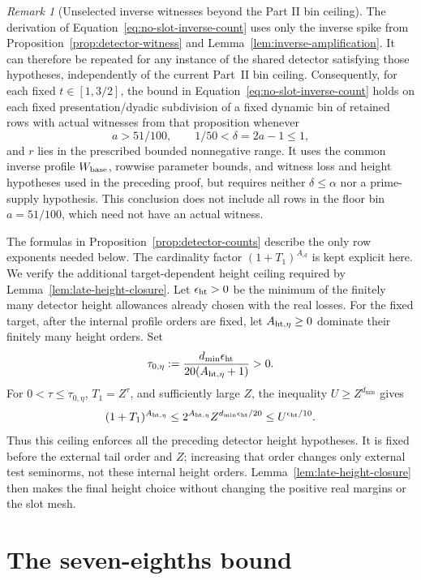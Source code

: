 \documentclass[11pt,a4paper]{article}
\numberwithin{equation}{section}
\numberwithin{figure}{section}
\theoremstyle{definition}
\theoremstyle{remark}
\newtheorem{remark}[theorem]{Remark}
\begin{document}
\begin{remark}[Unselected inverse witnesses beyond the Part II bin ceiling]
The derivation of Equation~\eqref{eq:no-slot-inverse-count} uses only the inverse spike from
Proposition~\ref{prop:detector-witness} and
Lemma~\ref{lem:inverse-amplification}.  It can therefore be repeated for any
instance of the shared detector satisfying those hypotheses, independently
of the current Part~II bin ceiling.  Consequently, for each fixed
\(t\in[1,3/2]\), the bound in Equation~\eqref{eq:no-slot-inverse-count}
holds on each fixed presentation/dyadic subdivision of a fixed dynamic
bin of retained rows with actual witnesses from that proposition whenever
\[
 a>51/100,\qquad 1/50<\delta=2a-1\le1,
\]
and \(r\) lies in the prescribed bounded nonnegative range.  It uses
the common inverse profile \(W_{\rm base}\), rowwise parameter bounds,
and witness loss and height hypotheses used in the preceding proof,
but requires neither
\(\delta\le\alpha\) nor a prime-supply hypothesis.  This conclusion
does not include all rows in the floor bin \(a=51/100\), which need
not have an actual witness.
\end{remark}

The formulas in Proposition~\ref{prop:detector-counts} describe the
only row exponents needed below.  The cardinality factor
\((1+T_1)^{A_{\mathcal A}}\) is kept explicit here.  We verify the
additional target-dependent height ceiling required by
Lemma~\ref{lem:late-height-closure}.  Let \(\epsilon_{\rm ht}>0\) be the
minimum of the finitely many detector height allowances already chosen
with the real losses.  For the fixed target, after the internal profile
orders are fixed, let \(A_{{\rm ht},\eta}\ge0\) dominate their finitely many
height orders.  Set
\[
 \tau_{0,\eta}:=
 \frac{d_{\min}\epsilon_{\rm ht}}{20(A_{{\rm ht},\eta}+1)}>0.
\]
For \(0<\tau\le\tau_{0,\eta}\), \(T_1=Z^\tau\), and sufficiently large
\(Z\), the inequality \(U\ge Z^{d_{\min}}\) gives
\[
 (1+T_1)^{A_{{\rm ht},\eta}}
 \le 2^{A_{{\rm ht},\eta}}Z^{d_{\min}\epsilon_{\rm ht}/20}
 \le U^{\epsilon_{\rm ht}/10}.
\]
Thus this ceiling enforces all the preceding detector height hypotheses.
It is fixed before the external tail order and \(Z\); increasing that
order changes only external test seminorms, not these internal height
orders.  Lemma~\ref{lem:late-height-closure} then makes the final height
choice without changing the positive real margins or the slot mesh.

\section{The seven-eighths bound}\label{sec:conclusion}
\end{document}

